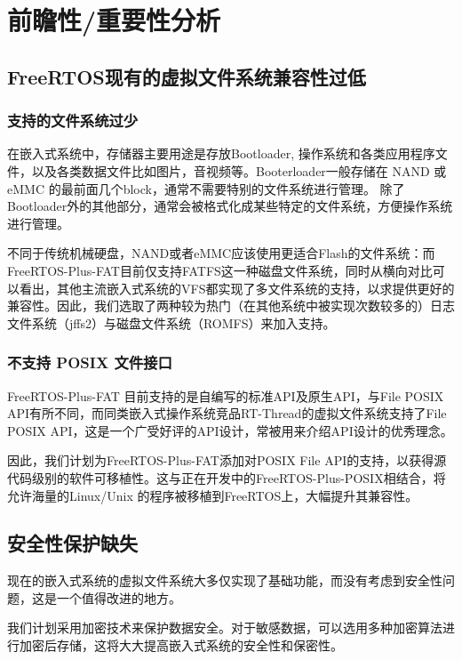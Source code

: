 \documentclass[UTF8,a4paper]{ctexart}
\begin{document}


\section{前瞻性/重要性分析}
\subsection{FreeRTOS现有的虚拟文件系统兼容性过低}
\subsubsection{支持的文件系统过少}
在嵌入式系统中，存储器主要用途是存放Bootloader, 操作系统和各类应用程序文件，以及各类数据文件比如图片，音视频等。Booterloader一般存储在 NAND 或 eMMC 的最前面几个block，通常不需要特别的文件系统进行管理。
除了Bootloader外的其他部分，通常会被格式化成某些特定的文件系统，方便操作系统进行管理。

不同于传统机械硬盘，NAND或者eMMC应该使用更适合Flash的文件系统：而FreeRTOS-Plus-FAT目前仅支持FATFS这一种磁盘文件系统，同时从横向对比可以看出，其他主流嵌入式系统的VFS都实现了多文件系统的支持，以求提供更好的兼容性。因此，我们选取了两种较为热门（在其他系统中被实现次数较多的）日志文件系统（jffs2）与磁盘文件系统（ROMFS）来加入支持。
\subsubsection{不支持 POSIX 文件接口}
FreeRTOS-Plus-FAT 目前支持的是自编写的标准API及原生API，与File POSIX API有所不同，而同类嵌入式操作系统竞品RT-Thread的虚拟文件系统支持了File POSIX API，这是一个广受好评的API设计，常被用来介绍API设计的优秀理念。

因此，我们计划为FreeRTOS-Plus-FAT添加对POSIX File API的支持，以获得源代码级别的软件可移植性。这与正在开发中的FreeRTOS-Plus-POSIX相结合，将允许海量的Linux/Unix 的程序被移植到FreeRTOS上，大幅提升其兼容性。
\subsection{安全性保护缺失}
现在的嵌入式系统的虚拟文件系统大多仅实现了基础功能，而没有考虑到安全性问题，这是一个值得改进的地方。

我们计划采用加密技术来保护数据安全。对于敏感数据，可以选用多种加密算法进行加密后存储，这将大大提高嵌入式系统的安全性和保密性。
\end{document}
